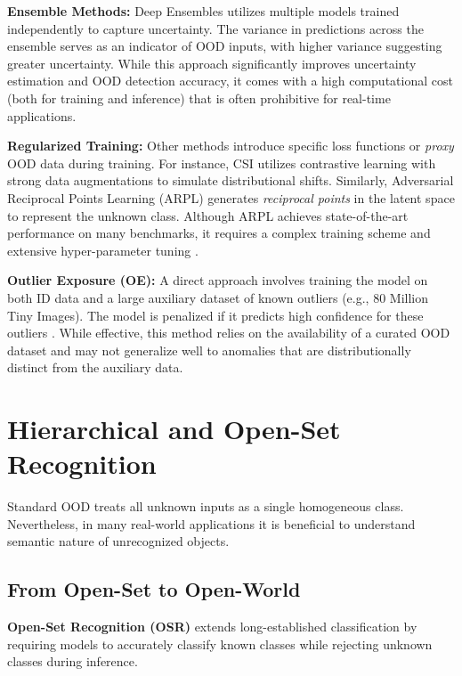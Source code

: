 \documentclass[oneside]{ctuthesis}
\begin{document}
\textbf{Ensemble Methods:} Deep Ensembles\cite{lakshminarayanan2017simplescalablepredictiveuncertainty} utilizes multiple models trained independently to capture uncertainty. The variance in predictions across the ensemble serves as an indicator of OOD inputs, with higher variance suggesting greater uncertainty. 
While this approach significantly improves uncertainty estimation and OOD detection accuracy, it comes with a high computational cost (both for training and inference) that is often prohibitive for real-time applications.

\textbf{Regularized Training:} Other methods introduce specific loss functions or \textit{proxy} OOD data during training. For instance, CSI \cite{king2025contextuallearninganomalydetection} utilizes contrastive learning with strong data augmentations to simulate distributional shifts. Similarly, Adversarial Reciprocal Points Learning (ARPL) \cite{repec:hin:jnlmpe:8268249,} generates \textit{reciprocal points} in the latent space to represent the unknown class. Although ARPL achieves state-of-the-art performance on many benchmarks, it requires a complex training scheme and extensive hyper-parameter tuning \cite{10350539}.

\textbf{Outlier Exposure (OE):} A direct approach involves training the model on both ID data and a large auxiliary dataset of known outliers (e.g., 80 Million Tiny Images). The model is penalized if it predicts high confidence for these outliers \cite{hendrycks2019deepanomalydetectionoutlier}. While effective, this method relies on the availability of a curated OOD dataset and may not generalize well to anomalies that are distributionally distinct from the auxiliary data.

\section{Hierarchical and Open-Set Recognition}
\label{sec:rel_hierarchical}
Standard OOD treats all unknown inputs as a single homogeneous class. Nevertheless, in many real-world applications it is beneficial
to understand semantic nature of unrecognized objects.

\subsection{From Open-Set to Open-World}
\label{sec:rel_openworld}
\textbf{Open-Set Recognition (OSR)} extends long-established classification by requiring models to accurately classify known classes while rejecting unknown classes during inference\cite{6365193}. 
\end{document}
